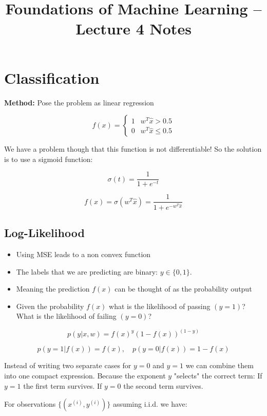 \documentclass[11pt]{article}
\title{Foundations of Machine Learning -- Lecture 4 Notes}
\author{}
\date{}
\begin{document}
\maketitle

\section*{Classification}
\textbf{Method:} Pose the problem as linear regression

\[
f(x) =
\begin{cases}
1 & w^T \hat{x} > 0.5 \\
0 & w^T \hat{x} \leq 0.5
\end{cases}
\]

We have a problem though that this function is not differentiable! 
So the solution is to use a sigmoid function:

\[
\sigma(t) = \frac{1}{1 + e^{-t}}
\]

\[
f(x) = \sigma(w^T \hat{x}) = \frac{1}{1 + e^{-w^T \hat{x}}}
\]


\subsection*{Log-Likelihood}

\begin{itemize}


\item Using MSE leads to a non convex function
    \item The labels that we are predicting are binary: $y \in \{0,1\}$.
    \item Meaning the prediction $f(x)$ can be thought of as the probability output
    \item Given the probability $f(x)$ what is the likelihood of passing $(y=1)$? What is the likelihood of failing $(y=0)$?
\end{itemize}

\[
p(y|x,w) = f(x)^y (1 - f(x))^{(1-y)}
\]


\[
p(y=1|f(x)) = f(x), \quad p(y=0|f(x)) = 1 - f(x)
\]


Instead of writing two separate cases for $y=0$ and $y=1$ we can combine them into one compact expression. Because the exponent $y$ "selects" the correct term:
If $y=1$ the first term survives.
If $y=0$ the second term survives.

\pagebreak

For observations $\{(x^{(i)}, y^{(i)})\}$ assuming i.i.d. we have:
\end{document}
